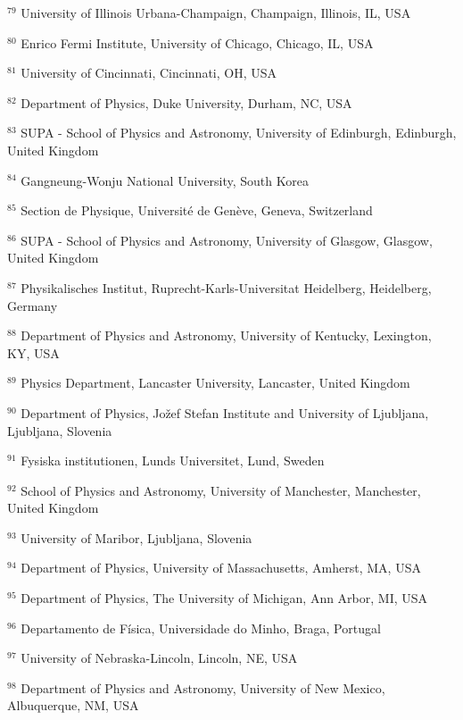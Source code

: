 \par {\footnotesize $^{79}$ University of Illinois Urbana-Champaign, Champaign, Illinois, IL, USA}
\par {\footnotesize $^{80}$ Enrico Fermi Institute, University of Chicago, Chicago, IL, USA}
\par {\footnotesize $^{81}$ University of Cincinnati, Cincinnati, OH, USA}
\par {\footnotesize $^{82}$ Department of Physics, Duke University, Durham, NC, USA}
\par {\footnotesize $^{83}$ SUPA - School of Physics and Astronomy, University of Edinburgh, Edinburgh, United Kingdom}
\par {\footnotesize $^{84}$ Gangneung-Wonju National University, South Korea}
\par {\footnotesize $^{85}$ Section de Physique, Université de Genève, Geneva, Switzerland}
\par {\footnotesize $^{86}$ SUPA - School of Physics and Astronomy, University of Glasgow, Glasgow, United Kingdom}
\par {\footnotesize $^{87}$ Physikalisches Institut, Ruprecht-Karls-Universitat Heidelberg, Heidelberg, Germany}
\par {\footnotesize $^{88}$ Department of Physics and Astronomy, University of Kentucky, Lexington, KY, USA}
\par {\footnotesize $^{89}$ Physics Department, Lancaster University, Lancaster, United Kingdom}
\par {\footnotesize $^{90}$ Department of Physics, Jožef Stefan Institute and University of Ljubljana, Ljubljana, Slovenia}
\par {\footnotesize $^{91}$ Fysiska institutionen, Lunds Universitet, Lund, Sweden}
\par {\footnotesize $^{92}$ School of Physics and Astronomy, University of Manchester, Manchester, United Kingdom}
\par {\footnotesize $^{93}$ University of Maribor, Ljubljana, Slovenia}
\par {\footnotesize $^{94}$ Department of Physics, University of Massachusetts, Amherst, MA, USA}
\par {\footnotesize $^{95}$ Department of Physics, The University of Michigan, Ann Arbor, MI, USA}
\par {\footnotesize $^{96}$ Departamento de Física, Universidade do Minho, Braga, Portugal}
\par {\footnotesize $^{97}$ University of Nebraska-Lincoln, Lincoln, NE, USA}
\par {\footnotesize $^{98}$ Department of Physics and Astronomy, University of New Mexico, Albuquerque, NM, USA}

